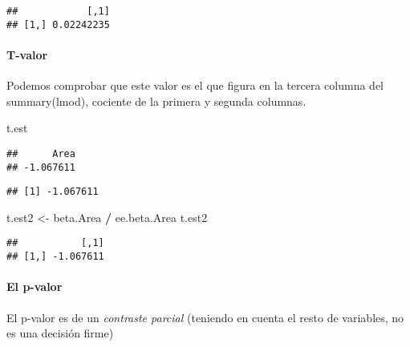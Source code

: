 \documentclass[
]{article}
\newenvironment{Shaded}{\begin{snugshade}}{\end{snugshade}}
\newcommand{\DecValTok}[1]{\textcolor[rgb]{0.00,0.00,0.81}{#1}}
\newcommand{\NormalTok}[1]{#1}
\newcommand{\OtherTok}[1]{\textcolor[rgb]{0.56,0.35,0.01}{#1}}
\newcommand{\SpecialCharTok}[1]{\textcolor[rgb]{0.81,0.36,0.00}{\textbf{#1}}}
\begin{document}
\begin{verbatim}
##            [,1]
## [1,] 0.02242235
\end{verbatim}

\hypertarget{t-valor}{%
\paragraph{T-valor}\label{t-valor}}

Podemos comprobar que este valor es el que figura en la tercera columna
del summary(lmod), cociente de la primera y segunda columnas.

\begin{Shaded}
\begin{Highlighting}[]
\NormalTok{t.est}
\end{Highlighting}
\end{Shaded}

\begin{verbatim}
##      Area 
## -1.067611
\end{verbatim}

\begin{Shaded}
\end{Shaded}

\begin{verbatim}
## [1] -1.067611
\end{verbatim}

\begin{Shaded}
\begin{Highlighting}[]
\NormalTok{t.est2 }\OtherTok{\textless{}{-}}\NormalTok{ beta.Area }\SpecialCharTok{/}\NormalTok{ ee.beta.Area}
\NormalTok{t.est2}
\end{Highlighting}
\end{Shaded}

\begin{verbatim}
##           [,1]
## [1,] -1.067611
\end{verbatim}

\hypertarget{el-p-valor}{%
\paragraph{El p-valor}\label{el-p-valor}}

El p-valor es de un \emph{contraste parcial} (teniendo en cuenta el
resto de variables, no es una decisión firme)
\end{document}

